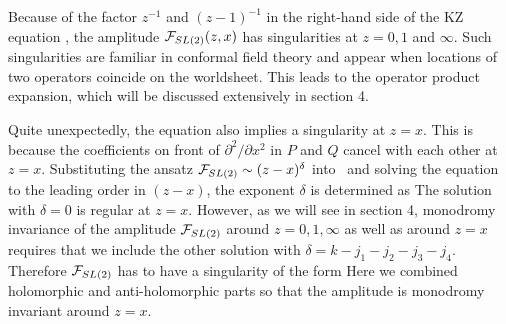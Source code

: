 Because of the factor $z^{-1}$ and $(z-1)^{-1}$ in the right-hand
side of the KZ equation \kzequation , the amplitude
${\cal F}_{SL(2)}(z,x)$ has singularities at $z=0, 1$ and $\infty$.
Such singularities are familiar in conformal field theory
and appear when locations of two operators coincide on the
worldsheet. This leads to the operator product expansion,
which will be discussed extensively in section 4.

Quite unexpectedly,
the equation also implies a singularity at $z=x$.
This is because the coefficients
on front of $\partial^2/\partial x^2$ in $P$ and $Q$ cancel with each
other at $z=x$. Substituting the ansatz ${\cal F}_{SL(2)}
\sim (z-x)^\delta$ into \kzequation\ and solving the
equation to the leading order in $(z-x)$, the exponent
$\delta$ is determined as
\eqn{}
The solution with $\delta=0$ is regular at $z=x$.
However, as we will see in section 4,  monodromy
invariance of the amplitude
${\cal F}_{SL(2)}$ around
$z=0,1,\infty$ as well as around $z=x$ requires
that we include the other solution with $\delta
=k-j_1-j_2-j_3-j_4$. Therefore
${\cal F}_{SL(2)}$ has to have a singularity of the form
\eqn{}
Here we combined holomorphic and anti-holomorphic
parts so that the amplitude is monodromy invariant around
$z=x$.

